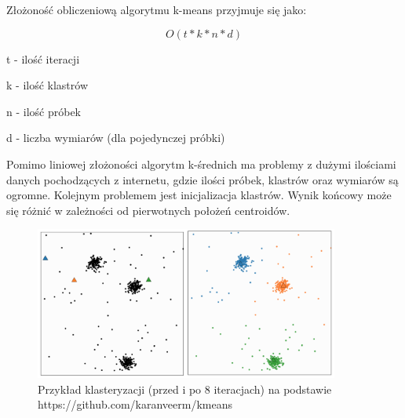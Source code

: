 Złożoność obliczeniową algorytmu k-means przyjmuje się jako: 

\[ O(t * k * n * d) \]

\begin{center}
t - ilość iteracji

k - ilość klastrów

n - ilość próbek

d - liczba wymiarów (dla pojedynczej próbki)
\end{center}

Pomimo liniowej złożoności algorytm k-średnich ma problemy z dużymi ilościami danych pochodzących z internetu, gdzie ilości próbek, klastrów oraz wymiarów są ogromne. Kolejnym problemem jest inicjalizacja klastrów. Wynik końcowy może się różnić w zależności od pierwotnych położeń centroidów.

\begin{figure}[H]
    \includegraphics[width=10cm]{kmeans_example.png}
    \centering
    \caption{Przykład klasteryzacji (przed i po 8 iteracjach) na podstawie https://github.com/karanveerm/kmeans}
\end{figure} 
